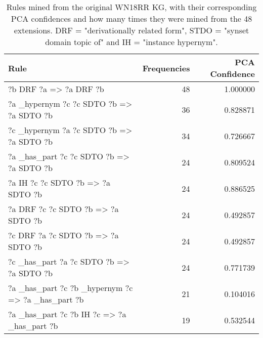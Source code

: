 \begin{table}[h]
\begin{tabular}{lrr}
\toprule
                                                                                                      Rule &  Frequencies &  PCA Confidence \\
\midrule
                            ?b  DRF  ?a   => ?a  DRF  ?b &           48 &        1.000000 \\
                   ?a  \_hypernym  ?c  ?c  SDTO  ?b   => ?a  SDTO  ?b &           36 &        0.828871 \\
                   ?c  \_hypernym  ?a  ?c  SDTO  ?b   => ?a  SDTO  ?b &           34 &        0.726667 \\
                   ?a  \_has\_part  ?c  ?c  SDTO  ?b   => ?a  SDTO  ?b &           24 &        0.809524 \\
          ?a  IH  ?c  ?c  SDTO  ?b   => ?a  SDTO  ?b &           24 &        0.886525 \\
?a  DRF  ?c  ?c  SDTO  ?b   => ?a  SDTO  ?b &           24 &        0.492857 \\
?c  DRF  ?a  ?c  SDTO  ?b   => ?a  SDTO  ?b &           24 &        0.492857 \\
                   ?c  \_has\_part  ?a  ?c  SDTO  ?b   => ?a  SDTO  ?b &           24 &        0.771739 \\
                                               ?a  \_has\_part  ?c  ?b  \_hypernym  ?c   => ?a  \_has\_part  ?b &           21 &        0.104016 \\
                                      ?a  \_has\_part  ?c  ?b  IH  ?c   => ?a  \_has\_part  ?b &           19 &        0.532544 \\
\bottomrule
\end{tabular}
\caption{Rules mined from the original WN18RR KG, with their corresponding PCA confidences and how many times they were mined from the 48 extensions. DRF = "derivationally related form", STDO = "synset domain topic of" and IH = "instance hypernym".}
\label{wn18rr_original_rules_table_frequencies}
\end{table}

